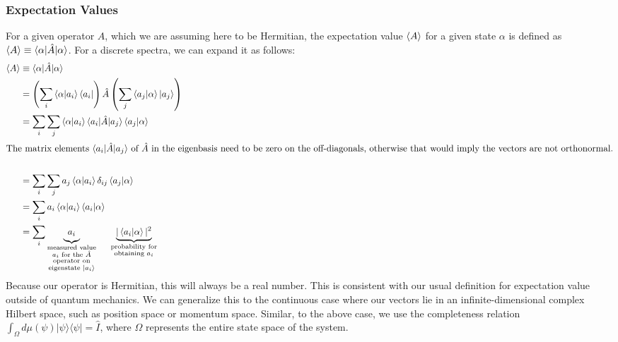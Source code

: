 \documentclass[12pt]{article}
\numberwithin{equation}{section}
\begin{document}
\subsubsection{Expectation Values}
\hspace{1cm} For a given operator $A$, which we are assuming here to be Hermitian, the expectation value $\braket{A}$ for a given state $\alpha$ is defined as $\braket{A} \equiv \braket{\alpha | \hat{A} | \alpha}$. For a discrete spectra, we can expand it as follows:
\begin{align*}
    \braket{A} &\equiv \braket{\alpha | \hat{A} | \alpha}\\
    &= \left( \sum_{i} \braket{\alpha | a_i} \bra{a_i} \right) \hat{A} \left( \sum_{j} \braket{a_j | \alpha} \ket{a_j} \right) \\
    &= \sum_{i} \sum_{j} \braket{\alpha | a_i} \braket{a_i | \hat{A} | a_j} \braket{a_j | \alpha} \\
    \intertext{The matrix elements $\braket{a_i | \hat{A} | a_j}$ of $\hat{A}$ in the eigenbasis need to be zero on the off-diagonals, otherwise that would imply the vectors are not orthonormal.}\\
    &= \sum_{i} \sum_{j} a_j \braket{\alpha | a_i} \delta_{i j} \braket{a_j | \alpha} \\
    &= \sum_{i} a_i \braket{\alpha | a_i} \braket{a_i | \alpha} \\
    &= \sum_{i} \underbrace{a_i \vphantom{\big|}}_{\substack{\text{measured value} \\ a_i \text{ for the } \hat{A} \\ \text{ operator on } \\ \text {eigenstate } \ket{a_i} }} \hspace{0.5cm} \underbrace{|\braket{a_i | \alpha}|^2}_{\substack{\text{probability for} \\ \text{obtaining } a_i}} \\
\end{align*}
\hspace{1cm} Because our operator is Hermitian, this will always be a real number. This is consistent with our usual definition for expectation value outside of quantum mechanics. We can generalize this to the continuous case where our vectors lie in an infinite-dimensional complex Hilbert space, such as position space or momentum space. Similar, to the above case, we use the completeness relation $\int_\Omega d\mu(\psi) |\psi\rangle\langle\psi| = \hat{I}$, where $\Omega$ represents the entire state space of the system.
\allowdisplaybreaks
\end{document}
